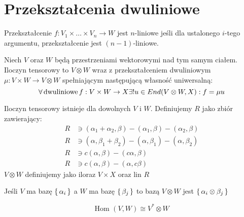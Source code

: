 \section{Przekształcenia dwuliniowe}


\begin{definition}
    Przekształcenie $f : V_{1} \times \dots \times V_{n} \to W$ jest $n$-liniowe jeśli dla ustalonego $i$-tego argumentu, przekształcenie jest $(n-1)$-liniowe.
\end{definition}

\begin{definition}
    Niech $V$ oraz $W$ będą przestrzeniami wektorowymi nad tym samym ciałem. Iloczyn tensorowy to $V \otimes W$ wraz z przekształceniem dwuliniowym $\mu : V \times W \to V \otimes W$ spełniającym następującą własność uniwersalną:
    \begin{equation*}
        \forall \text{\,dwuliniowe\,}f: V \times W \to X \exists ! u \in End(V \otimes W, X) : f = \mu u
    \end{equation*}
\end{definition}

\theorem Iloczyn tensorowy istnieje dla dowolnych $V$ i $W$. Definiujemy $R$ jako zbiór zawierający:
\begin{align*}
    R & \ni (\alpha_1 + \alpha_2, \beta) - (\alpha_1, \beta) - (\alpha_2, \beta) \\
    R & \ni (\alpha, \beta_1 + \beta_2) - (\alpha, \beta_1) - (\alpha, \beta_2) \\
    R & \ni c(\alpha, \beta) - (c\alpha, \beta) \\
     R & \ni c(\alpha, \beta) - (\alpha, c\beta)
\end{align*}
$V \otimes W$ definiujemy jako iloraz $V \times X$ oraz $\text{lin }R$

\begin{corollary}Jeśli $V$ ma bazę $\set{\alpha_i}$ a $W$ ma bazę $\set{\beta_j}$ to bazą $V \otimes W$ jest $\set{\alpha_i \otimes \beta_j}$
\end{corollary}

\begin{example}
\[ \text{Hom } (V, W) \cong V^* \otimes W \]
\end{example}


